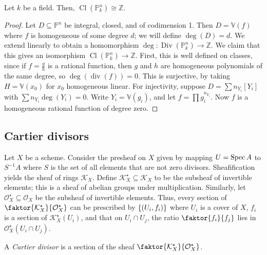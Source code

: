 \begin{proposition}
    Let \( k \) be a field.
    Then, \( \operatorname{Cl}(\mathbb P^n_k) \cong \mathbb Z \).
\end{proposition}
\begin{proof}
    Let \( D \subseteq \mathbb P^n \) be integral, closed, and of codimension 1.
    Then \( D = \mathbb V(f) \) where \( f \) is homogeneous of some degree \( d \); we will define \( \deg(D) = d \).
    We extend linearly to obtain a homomorphism \( \deg : \operatorname{Div}(\mathbb P^n_k) \to \mathbb Z \).
    We claim that this gives an isomorphism \( \operatorname{Cl}(\mathbb P^n_k) \to \mathbb Z \).
    First, this is well defined on classes, since if \( f = \frac{g}{h} \) is a rational function, then \( g \) and \( h \) are homogeneous polynomials of the same degree, so \( \deg(\operatorname{div}(f)) = 0 \).
    This is surjective, by taking \( H = \mathbb V(x_0) \) for \( x_0 \) homogeneous linear.
    For injectivity, suppose \( D = \sum n_{Y_i} [Y_i] \) with \( \sum n_{Y_i} \deg(Y_i) = 0 \).
    Write \( Y_i = \mathbb V(g_i) \), and let \( f = \prod g_i^{n_{Y_i}} \).
    Now \( f \) is a homogeneous rational function of degree zero.
\end{proof}

\subsection{Cartier divisors}
Let \( X \) be a scheme.
Consider the presheaf on \( X \) given by mapping \( U = \operatorname{Spec} A \) to \( S^{-1}A \) where \( S \) is the set of all elements that are not zero divisors.
Sheafification yields the sheaf of rings \( \mathcal K_X \).
Define \( \mathcal K_X^\star \subseteq \mathcal K_X \) to be the subsheaf of invertible elements; this is a sheaf of abelian groups under multiplication.
Similarly, let \( \mathcal O_X^\star \subseteq \mathcal O_X \) be the subsheaf of invertible elements.
Thus, every section of \( \faktor{\mathcal K_X^\star}{\mathcal O_X^\star} \) can be prescribed by \( \qty{(U_i, f_i)} \) where \( U_i \) is a cover of \( X \), \( f_i \) is a section of \( \mathcal K_X^\star(U_i) \), and that on \( U_i \cap U_j \), the ratio \( \faktor{f_i}{f_j} \) lies in \( \mathcal O_X^\star(U_i \cap U_j) \).
\begin{definition}
    A \emph{Cartier divisor} is a section of the sheaf \( \faktor{\mathcal K_X^\star}{\mathcal O_X^\star} \).
\end{definition}
